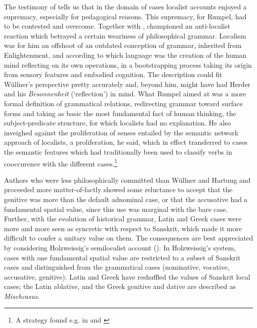 \documentclass[english,output=paper,colorlinks,citecolor=brown]{../langscibook}
\begin{document}
The testimony of \citet{Rumpel1845} tells us that in the domain of cases localist accounts enjoyed a supremacy, especially for pedagogical reasons. This supremacy, for Rumpel, had to be contested and overcome. Together with \citet{Curtius1864}, \citet{Rumpel1845,Rumpel1866} championed an anti-localist reaction which betrayed a certain weariness of philosophical grammar. Localism was for him an offshoot of an outdated conception of grammar, inherited from Enlightenment, and according to which language was the creation of the human mind reflecting on its own operations, in a bootstrapping process taking its origin from sensory features and embodied cognition. The description could fit Wüllner’s perspective pretty accurately and, beyond him, might have had Herder and his \textit{Besonnenheit} (‘reflection’) in mind. What Rumpel aimed at was a more formal definition of grammatical relations, redirecting grammar toward surface forms and taking as basic the most fundamental fact of human thinking, the subject-predicate structure, for which localists had no explanation. He also inveighed against the proliferation of senses entailed by the semantic network approach of localists, a proliferation, he said, which in effect transferred to cases the semantic features which had traditionally been used to classify verbs in cooccurence with the different cases.\footnote{A strategy found e.g. in \citet{Despautère1527} and \citet{Lancelot1653}}

Authors who were less philosophically committed than Wüllner and Hartung and proceeded more matter-of-factly showed some reluctance to accept that the genitive was more than the default adnominal case, or that the accusative had a fundamental spatial value, since this use was marginal with the bare case. Further, with the evolution of historical grammar, Latin and Greek cases were more and more seen as syncretic with respect to Sanskrit, which made it more difficult to confer a unitary value on them. The consequences are best appreciated by considering Holzweissig’s semilocalist account (\citealt{Holzweissig1877}). In Holzweissig’s system, cases with one fundamental spatial value are restricted to a subset of Sanskrit cases and distinguished from the grammatical cases (nominative, vocative, accusative, genitive). Latin and Greek have reshuffled the values of Sanskrit local cases; the Latin ablative, and the Greek genitive and dative are described as \textit{Mischcasus}.
\end{document}
